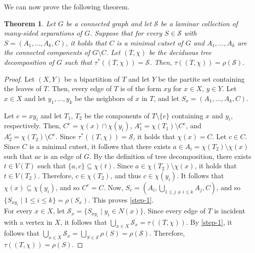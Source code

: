 \documentclass[12pt]{amsart}
\renewcommand{\S}{\mathcal{S}}
\newtheorem{theorem}{Theorem}
\newcounter{tbox}
\newcommand{\sta}[1]{\vspace*{0.3cm}\refstepcounter{tbox}\noindent{ \parbox{\textwidth}{(\thetbox) \emph{#1}}}\vspace*{0.3cm}}
\begin{document}
We can now prove the following theorem. 
\begin{theorem}
\label{thm:deciduous-minimal}
Let $G$ be a connected graph and let $\S$ be a laminar collection of many-sided separations of $G$. Suppose that for every $S \in \S$ with $S = (A_1, \hdots, A_k, C)$, it holds that $C$ is a minimal cutset of $G$ and $A_1, \hdots, A_k$ are the connected components of $G \setminus C$. Let $(T, \chi)$ be the deciduous tree decomposition of $G$ such that $\tau^*((T, \chi)) = \S$. Then, $\tau((T, \chi)) = \rho(\S)$. 
\end{theorem}
\begin{proof}
Let $(X, Y)$ be a bipartition of $T$ and let $Y$ be the partite set containing the leaves of $T$. Then, every edge of $T$ is of the form $xy$ for $x \in X$, $y \in Y$. Let $x \in X$ and let $y_1, \hdots, y_k$ be the neighbors of $x$ in $T$, and let $S_x = (A_1, \hdots, A_k, C)$. 

\sta{\label{step-1} $\{S_{xy_i} \mid 1 \leq i \leq k\} = \rho(S_x)$.} 

Let $e = xy_i$ and let $T_1$, $T_2$ be the components of $T \setminus \{e\}$ containing $x$ and $y_i$, respectively. Then, $C^e = \chi(x) \cap \chi(y_i)$, $A_1^e = \chi(T_1) \setminus C^e$, and $A_2^e = \chi(T_2) \setminus C^e$. Since $\tau^*((T, \chi)) = \mathcal{S}$, it holds that $\chi(x) = C$. Let $c \in C$. Since $C$ is a minimal cutset, it follows that there exists $a \in A_i = \chi(T_2) \setminus \chi(x)$ such that $ac$ is an edge of $G$. By the definition of tree decomposition, there exists $t \in V(T)$ such that $\{a, c\} \subseteq \chi(t)$. Since $a \in \chi(T_2) \setminus \chi(x)$, it holds that $t \in V(T_2)$. Therefore, $c \in \chi(T_2)$, and thus $c \in \chi(y_i)$. It follows that $\chi(x) \subseteq \chi(y_i)$, and so $C^e = C$. Now, $S_e = (A_i, \bigcup_{1\leq j \neq i \leq k} A_j, C)$, and so $\{S_{xy_i} \mid 1 \leq i \leq k\} = \rho(S_x)$. This proves \eqref{step-1}.\\ 

For every $x \in X$, let $\S_x = \{S_{xy_i} \mid y_i \in N(x)\}$. Since every edge of $T$ is incident with a vertex in $X$, it follows that $\bigcup_{x \in X} \S_x = \tau((T, \chi))$. By \eqref{step-1}, it follows that $\bigcup_{x \in X} \S_x = \bigcup_{S \in \S} \rho(S) = \rho(\S)$. Therefore, $\tau((T, \chi)) = \rho(S)$. 
\end{proof}

 
\end{document}
